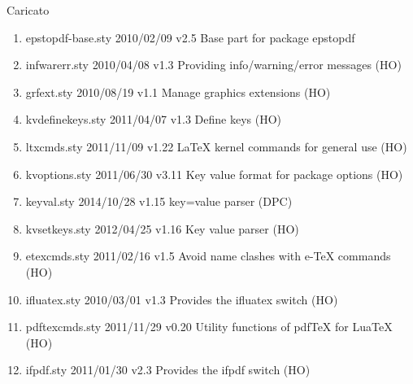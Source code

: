 Caricato 
\begin{enumerate}
\item epstopdf-base.sty 2010/02/09 v2.5 Base part for package epstopdf
\item infwarerr.sty 2010/04/08 v1.3 Providing info/warning/error messages (HO)
\item grfext.sty 2010/08/19 v1.1 Manage graphics extensions (HO)
\item kvdefinekeys.sty 2011/04/07 v1.3 Define keys (HO)
\item ltxcmds.sty 2011/11/09 v1.22 LaTeX kernel commands for general use (HO)
\item kvoptions.sty 2011/06/30 v3.11 Key value format for package options (HO)
\item keyval.sty 2014/10/28 v1.15 key=value parser (DPC)
\item kvsetkeys.sty 2012/04/25 v1.16 Key value parser (HO)
\item etexcmds.sty 2011/02/16 v1.5 Avoid name clashes with e-TeX commands (HO)
\item ifluatex.sty 2010/03/01 v1.3 Provides the ifluatex switch (HO)
\item pdftexcmds.sty 2011/11/29 v0.20 Utility functions of pdfTeX for LuaTeX (HO)
\item ifpdf.sty 2011/01/30 v2.3 Provides the ifpdf switch (HO)
\end{enumerate} 
